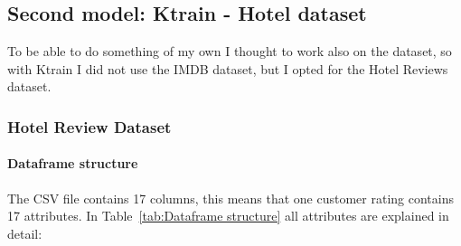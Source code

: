 \subsection{Second model: Ktrain - Hotel dataset}
To be able to do something of my own I thought to work also on the dataset, so with Ktrain I did not use the IMDB dataset, but I opted for the Hotel Reviews dataset.

\subsubsection{Hotel Review Dataset}
\paragraph*{Dataframe structure}
The CSV file contains 17 columns, this means that one customer rating contains 17 attributes. In Table~\ref{tab:Dataframe structure} all attributes are explained in detail:

